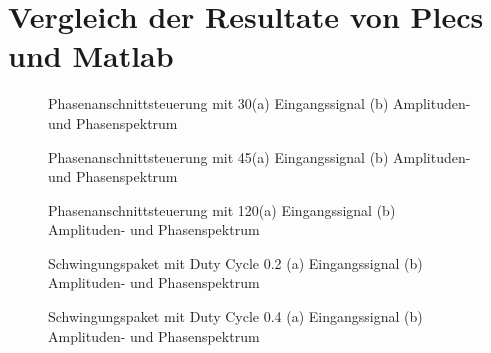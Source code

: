 \begin{appendix}
\begin{lstlisting}[basicstyle=\tiny,style=myArduino]
\end{lstlisting}

\newpage
\section{Vergleich der Resultate von Plecs und Matlab}\label{sec:Vergleich_der_Resultate}

\begin{figure}[ht!]
	\centering
	\qquad
	\caption{Phasenanschnittsteuerung mit 30\textdegree (a) Eingangssignal (b) Amplituden- und Phasenspektrum}
	\label{fig:Phasenanschnittsteuerung_mit_30}
\end{figure}

\begin{figure}[ht!]
	\centering
	\qquad
	\caption{Phasenanschnittsteuerung mit 45\textdegree (a) Eingangssignal (b) Amplituden- und Phasenspektrum}
	\label{fig:Phasenanschnittsteuerung_mit_45}
\end{figure}

\begin{figure}[ht!]
	\centering
	\qquad
	\caption{Phasenanschnittsteuerung mit 120\textdegree (a) Eingangssignal (b) Amplituden- und Phasenspektrum}
	\label{fig:Phasenanschnittsteuerung_mit_120}
\end{figure}

\newpage

\begin{figure}[ht!]
	\centering
	\qquad
	\caption{Schwingungspaket mit Duty Cycle 0.2 (a) Eingangssignal (b) Amplituden- und Phasenspektrum}
	\label{fig:Schwingungspaketsteuerung_mit_duty_cycle_0_2}
\end{figure}


\begin{figure}[ht!]
	\centering
	\qquad
	\caption{Schwingungspaket mit Duty Cycle 0.4 (a) Eingangssignal (b) Amplituden- und Phasenspektrum}
	\label{fig:Schwingungspaketsteuerung_mit_duty_cycle_0_4}
\end{figure}


\end{appendix}
